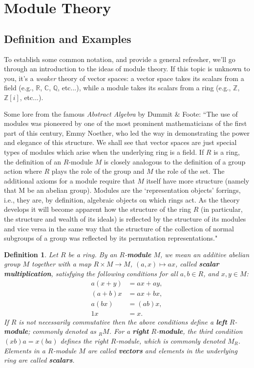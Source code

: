 \documentclass[12pt,reqno]{amsart}
\theoremstyle{plain}
\newtheorem{defi}{Definition}
\newcommand{\rr}{\mathbb R}
\newcommand{\cc}{\mathbb C}
\newcommand{\zz}{\mathbb Z}
\newcommand{\qq}{\mathbb Q}
\begin{document}
\section{Module Theory}
\subsection{Definition and Examples}
To establish some common notation, and provide a general refresher, we'll go through an introduction to the ideas of module theory. If this topic is unknown to you, it's a \textit{weaker} theory of vector spaces: a vector space takes its scalars from a field (e.g., $\rr$, $\cc$, $\qq$, etc...), while a module takes its scalars from a ring (e.g., $\zz$, $\zz [i]$, etc...).

Some lore from the famous \textit{Abstract Algebra} by Dummit $\&$ Foote: ``The use of modules was pioneered by one of the most prominent mathematicians of the first part of this century, Emmy Noether, who led the way in demonstrating the power and elegance of this structure. We shall see that vector spaces are just special types of modules which arise when the underlying ring is a field. If $R$ is a ring, the definition of an $R$-module $M$ is closely analogous to the definition of a group action where $R$ plays the role of the group and $M$ the role of the set. The additional axioms for a module require that $M$ itself have more structure (namely that M be an abelian group). Modules are the `representation objects' forrings, i.e., they are, by definition, algebraic objects on which rings act. As the theory develops it will become apparent how the structure of the ring $R$ (in particular, the structure and wealth of its ideals) is reflected by the structure of its modules and vice versa in the same way that the structure of the collection of normal subgroups of a group was reflected by its permutation representations."

\begin{defi} Let $R$ be a ring. By an $R$-\textbf{module} $M$, we mean an additive abelian group $M$ together with a map $R \times M \to M$, $(a, x) \mapsto ax$, called \textbf{scalar multiplication}, satisfying the following conditions for all $a, b \in R$, and $x, y \in M$: 
\begin{align*}
a(x+y) & = ax + ay,  \\
(a+b) x &= ax + bx, \\
a(bx) &= (ab)x, \\
1x &= x.
\end{align*}
If $R$ is not necessarily commutative then the above conditions define a \textbf{left} $R$-\textbf{module}; commonly denoted as $_R M$.  For a \textbf{right} $R$-\textbf{module}, the third condition $(xb)a = x(ba)$ defines the right $R$-module, which is commonly denoted $M_R$. Elements in a $R$-module $M$ are called \textbf{vectors} and elements in the underlying ring are called \textbf{scalars}. 
\end{defi} 
\end{document}
